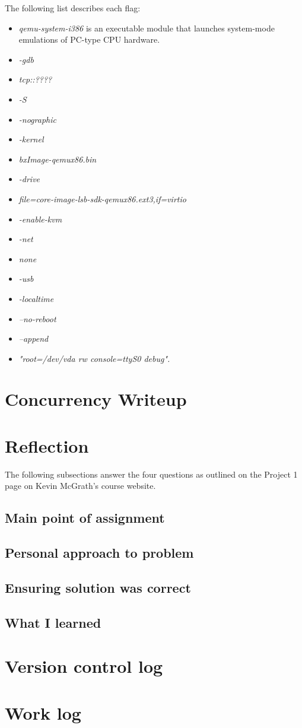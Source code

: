 \documentclass[letterpaper,10pt,titlepage]{article}
\begin{document}
The following list describes each flag:
\begin{itemize}
\item \emph{qemu-system-i386} is an executable module that launches system-mode emulations of PC-type CPU hardware.
\item \emph{-gdb}
\item \emph{tcp::????}
\item \emph{-S}
\item \emph{-nographic}
\item \emph{-kernel}
\item \emph{bxImage-qemux86.bin}
\item \emph{-drive}
\item \emph{file=core-image-lsb-sdk-qemux86.ext3,if=virtio}
\item \emph{-enable-kvm}
\item \emph{-net}
\item \emph{none}
\item \emph{-usb}
\item \emph{-localtime}
\item \emph{--no-reboot}
\item \emph{--append}
\item \emph{"root=/dev/vda rw console=ttyS0 debug".}
\end{itemize}

\section{Concurrency Writeup}

\section{Reflection}
The following subsections answer the four questions as outlined on the Project 1 page on Kevin McGrath's course website.
\subsection{Main point of assignment}
\subsection{Personal approach to problem}
\subsection{Ensuring solution was correct}
\subsection{What I learned}

\section{Version control log}

\section{Work log}

%
%
\end{document}
